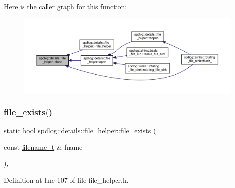 Here is the caller graph for this function\+:
\nopagebreak
\begin{figure}[H]
\begin{center}
\leavevmode
\includegraphics[width=350pt]{classspdlog_1_1details_1_1file__helper_a6a6d7a75014ae880857b4fe4fd01dc7a_icgraph}
\end{center}
\end{figure}
\mbox{\label{classspdlog_1_1details_1_1file__helper_a8c5f69588e8a54f436c3565317c233bd}} 
\subsubsection{\texorpdfstring{file\+\_\+exists()}{file\_exists()}}
{\footnotesize\ttfamily static bool spdlog\+::details\+::file\+\_\+helper\+::file\+\_\+exists (\begin{DoxyParamCaption}\item[{const \hyperlink{namespacespdlog_acf7ce125b3622e44f8f1702d699e0b06}{filename\+\_\+t} \&}]{fname }\end{DoxyParamCaption})\hspace{0.3cm}{\ttfamily [inline]}, {\ttfamily [static]}}



Definition at line 107 of file file\+\_\+helper.\+h.

